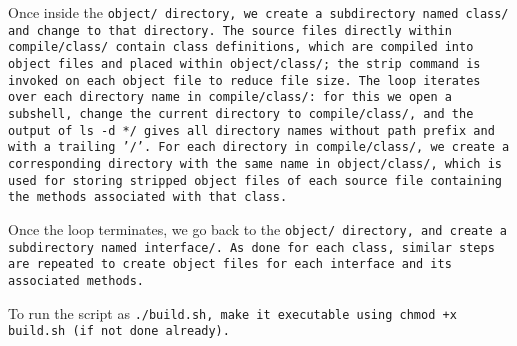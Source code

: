 Once inside the \tt{object/} directory, we create a
subdirectory named \tt{class/} and change to that directory.
The source files directly within \tt{compile/class/} contain class definitions,
which are compiled into object files and placed within \tt{object/class/};
the \tt{strip} command is invoked on each object file to reduce file size.
The loop iterates over each directory name in \tt{compile/class/}:
for this we open a subshell, change the current directory to
\tt{compile/class/}, and the output of \tt{ls -d */} gives all
directory names without path prefix and with a trailing \tt{'/'}.
For each directory in \tt{compile/class/}, we create a corresponding directory
with the same name in \tt{object/class/}, which is used for storing stripped
object files of each source file containing the methods associated with that class.

Once the loop terminates, we go back to the \tt{object/}
directory, and create a subdirectory named  \tt{interface/}.
As done for each class, similar steps are repeated to create
object files for each interface and its associated methods.

\note To run the script as \tt{./build.sh}, make it executable
using \tt{chmod +x build.sh} (if not done already).
